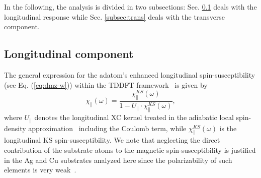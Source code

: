 \documentclass[prb,footinbib,showpacs,twocolumn,amsmath,amssymb]{revtex4}
\begin{document}
In the following, the analysis is divided in two subsections:
Sec. \ref{subsec:long} deals with the longitudinal response while Sec. \ref{subsec:trans} 
deals with the transverse component.

\subsection{Longitudinal component}
\label{subsec:long}



The general expression for the adatom's enhanced longitudinal spin-susceptibility 
(see Eq. (\ref{eq:dmz-w})) within the
TDDFT framework~\cite{PhysRevLett.119.017203} 
is given by
\begin{equation}
\label{eq:susc-long}
\chi_{\parallel}(\omega)=\dfrac{\chi^{KS}_{\parallel}(\omega)}{1-U_{\parallel}\cdot \chi_{\parallel}^{KS}(\omega)},
\end{equation}
where $U_{\parallel}$ denotes the longitudinal XC kernel treated in the 
adiabatic local spin-density approximation~\cite{ortenzi_accounting_2012} 
including the Coulomb term, while 
$\chi^{KS}_{\parallel}(\omega)$ is the longitudinal KS spin-susceptibility.
We note that neglecting the direct contribution of the substrate atoms to the magnetic
spin-susceptibility is justified in the Ag and Cu substrates analyzed here
since the polarizability of such elements is 
very weak~\cite{lounis_dynamical_2010,lounis_theory_2011,dias_relativistic_2015,PhysRevB.91.104420,PhysRevB.89.235439,ibanez-azpiroz_zero-point_2016}.
\end{document}
